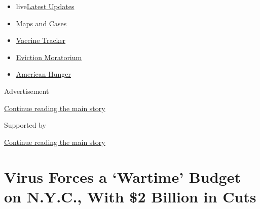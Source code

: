 \begin{itemize}
\tightlist
\item
  live\href{https://www.nytimes3xbfgragh.onion/2020/09/08/world/covid-19-coronavirus.html?name=styln-coronavirus-national\&region=TOP_BANNER\&block=storyline_menu_recirc\&action=click\&pgtype=Article\&impression_id=8b286471-f27f-11ea-8789-45ae9f4c38e2\&variant=undefined}{Latest
  Updates}
\item
  \href{https://www.nytimes3xbfgragh.onion/interactive/2020/us/coronavirus-us-cases.html?name=styln-coronavirus-national\&region=TOP_BANNER\&block=storyline_menu_recirc\&action=click\&pgtype=Article\&impression_id=8b286472-f27f-11ea-8789-45ae9f4c38e2\&variant=undefined}{Maps
  and Cases}
\item
  \href{https://www.nytimes3xbfgragh.onion/interactive/2020/science/coronavirus-vaccine-tracker.html?name=styln-coronavirus-national\&region=TOP_BANNER\&block=storyline_menu_recirc\&action=click\&pgtype=Article\&impression_id=8b286473-f27f-11ea-8789-45ae9f4c38e2\&variant=undefined}{Vaccine
  Tracker}
\item
  \href{https://www.nytimes3xbfgragh.onion/2020/09/02/your-money/eviction-moratorium-covid.html?name=styln-coronavirus-national\&region=TOP_BANNER\&block=storyline_menu_recirc\&action=click\&pgtype=Article\&impression_id=8b286474-f27f-11ea-8789-45ae9f4c38e2\&variant=undefined}{Eviction
  Moratorium}
\item
  \href{https://www.nytimes3xbfgragh.onion/interactive/2020/09/02/magazine/food-insecurity-hunger-us.html?name=styln-coronavirus-national\&region=TOP_BANNER\&block=storyline_menu_recirc\&action=click\&pgtype=Article\&impression_id=8b286475-f27f-11ea-8789-45ae9f4c38e2\&variant=undefined}{American
  Hunger}
\end{itemize}

Advertisement

\protect\hyperlink{after-top}{Continue reading the main story}

Supported by

\protect\hyperlink{after-sponsor}{Continue reading the main story}

\hypertarget{virus-forces-a-wartime-budget-on-nyc-with-2-billion-in-cuts}{%
\section{Virus Forces a `Wartime' Budget on N.Y.C., With \$2 Billion in
Cuts}\label{virus-forces-a-wartime-budget-on-nyc-with-2-billion-in-cuts}}

